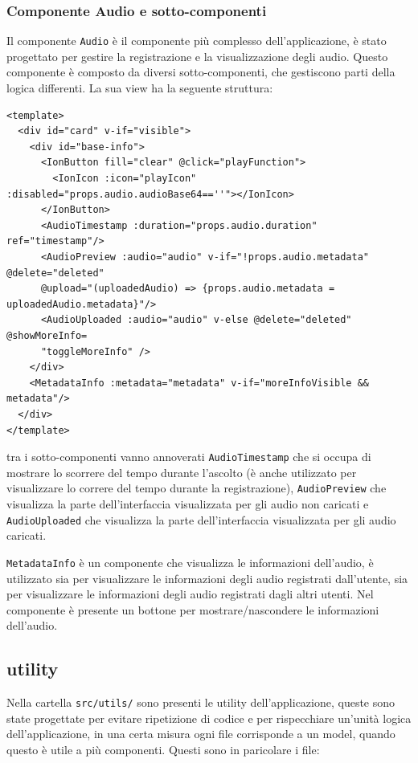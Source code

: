 \documentclass{article}
\begin{document}
\subsubsection{Componente Audio e sotto-componenti}
Il componente \texttt{Audio} è il componente più complesso dell'applicazione, è stato progettato per gestire la registrazione e la visualizzazione degli audio. Questo componente è composto da diversi sotto-componenti, che gestiscono parti della logica differenti. La sua view ha la seguente struttura:
\begin{verbatim}
<template>
  <div id="card" v-if="visible">
    <div id="base-info">
      <IonButton fill="clear" @click="playFunction">
        <IonIcon :icon="playIcon" :disabled="props.audio.audioBase64==''"></IonIcon>
      </IonButton>
      <AudioTimestamp :duration="props.audio.duration" ref="timestamp"/>
      <AudioPreview :audio="audio" v-if="!props.audio.metadata" @delete="deleted" 
      @upload="(uploadedAudio) => {props.audio.metadata = uploadedAudio.metadata}"/>
      <AudioUploaded :audio="audio" v-else @delete="deleted" @showMoreInfo=
      "toggleMoreInfo" />
    </div>
    <MetadataInfo :metadata="metadata" v-if="moreInfoVisible && metadata"/>
  </div>
</template>
\end{verbatim}

tra i sotto-componenti vanno annoverati \texttt{AudioTimestamp} che si occupa di mostrare lo scorrere del tempo durante l'ascolto (è anche utilizzato per visualizzare lo correre del tempo durante la registrazione), \texttt{AudioPreview} che visualizza la parte dell'interfaccia visualizzata per gli audio non caricati e \texttt{AudioUploaded} che visualizza la parte dell'interfaccia visualizzata per gli audio caricati.

\texttt{MetadataInfo} è un componente che visualizza le informazioni dell'audio, è utilizzato sia per visualizzare le informazioni degli audio registrati dall'utente, sia per visualizzare le informazioni degli audio registrati dagli altri utenti. Nel componente è presente un bottone per mostrare/nascondere le informazioni dell'audio.



\subsection{utility}
Nella cartella \texttt{src/utils/} sono presenti le utility dell'applicazione, queste sono state progettate per evitare ripetizione di codice e per rispecchiare un'unità logica dell'applicazione, in una certa misura ogni file corrisponde a un model, quando questo è utile a più componenti. Questi sono in paricolare i file:
\end{document}
